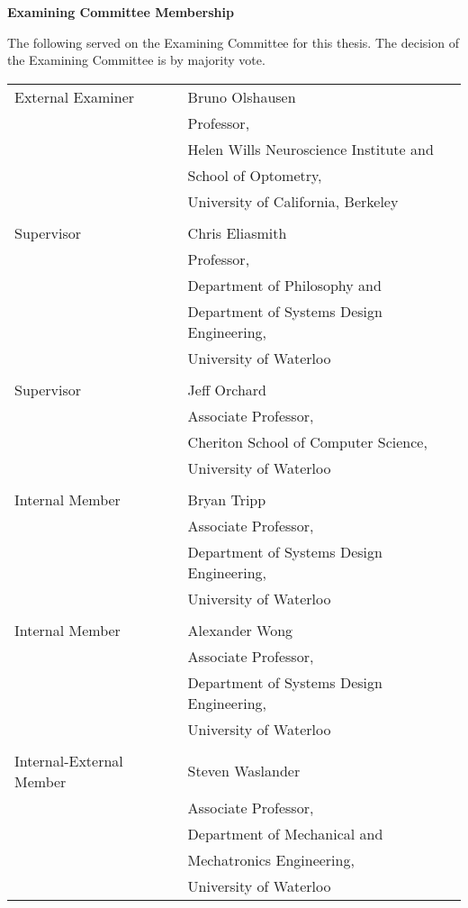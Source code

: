 \pagestyle{plain}
\setcounter{page}{2}

\cleardoublepage

{}

\noindent
\textbf{Examining Committee Membership}

\noindent
The following served on the Examining Committee for this thesis.
The decision of the Examining Committee is by majority vote.

\vspace*{0.5cm}

\noindent
\begin{tabular}{p{2in}l}
External Examiner         & Bruno Olshausen \\
  & Professor,\\
  & Helen Wills Neuroscience Institute and\\
  & School of Optometry,\\
  & University of California, Berkeley\\
\\
Supervisor                & Chris Eliasmith \\
  & Professor,\\
  & Department of Philosophy and\\
  & Department of Systems Design Engineering,\\
  & University of Waterloo\\
\\
Supervisor                & Jeff Orchard \\
  & Associate Professor,\\
  & Cheriton School of Computer Science,\\
  & University of Waterloo\\
\\
Internal Member           & Bryan Tripp \\
  & Associate Professor,\\
  & Department of Systems Design Engineering,\\
  & University of Waterloo\\
\\
Internal Member           & Alexander Wong\\
  & Associate Professor,\\
  & Department of Systems Design Engineering,\\
  & University of Waterloo\\
\\
Internal-External Member  & Steven Waslander\\
  & Associate Professor,\\
  & Department of Mechanical and\\
  & Mechatronics Engineering,\\
  & University of Waterloo\\
\end{tabular}

